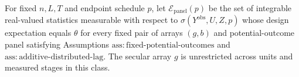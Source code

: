 For fixed \(n,L,T\) and endpoint schedule \(p\), let \(\mathcal E_{\mathrm{panel}}(p)\) be the set of integrable real-valued statistics measurable with respect to \(\sigma(Y^{\mathrm{obs}},U,Z,p)\) whose design expectation equals \(\theta\) for every fixed pair of arrays \((g,b)\) and potential-outcome panel satisfying Assumptions \(\mathrm{ass:fixed\text{-}potential\text{-}outcomes}\) and \(\mathrm{ass:additive\text{-}distributed\text{-}lag}\).  The secular array \(g\) is unrestricted across units and measured stages in this class.